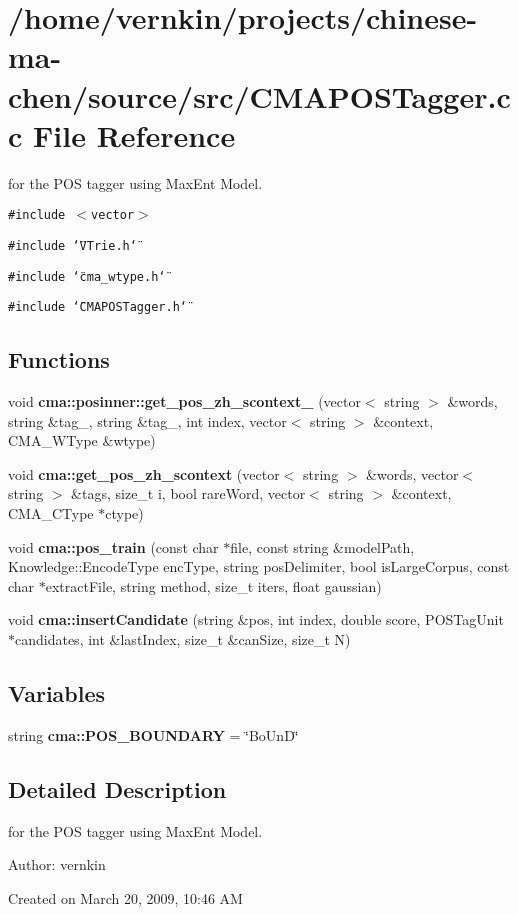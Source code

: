\section{/home/vernkin/projects/chinese-ma-chen/source/src/CMAPOSTagger.cc File Reference}
\label{CMAPOSTagger_8cc}
for the POS tagger using MaxEnt Model.  


{\tt \#include $<$vector$>$}\par
{\tt \#include \char`\"{}VTrie.h\char`\"{}}\par
{\tt \#include \char`\"{}cma\_\-wtype.h\char`\"{}}\par
{\tt \#include \char`\"{}CMAPOSTagger.h\char`\"{}}\par
\subsection*{Functions}
\begin{CompactItemize}
\item 
void \textbf{cma::posinner::get\_\-pos\_\-zh\_\-scontext\_} (vector$<$ string $>$ \&words, string \&tag\_, string \&tag\_, int index, vector$<$ string $>$ \&context, CMA\_\-WType \&wtype)\label{namespacecma_1_1posinner_f49e6c147898b0b7d3e88af33c64e8f1}

\item 
void {\bf cma::get\_\-pos\_\-zh\_\-scontext} (vector$<$ string $>$ \&words, vector$<$ string $>$ \&tags, size\_\-t i, bool rareWord, vector$<$ string $>$ \&context, CMA\_\-CType $\ast$ctype)
\item 
void {\bf cma::pos\_\-train} (const char $\ast$file, const string \&modelPath, Knowledge::EncodeType encType, string posDelimiter, bool isLargeCorpus, const char $\ast$extractFile, string method, size\_\-t iters, float gaussian)
\item 
void \textbf{cma::insertCandidate} (string \&pos, int index, double score, POSTagUnit $\ast$candidates, int \&lastIndex, size\_\-t \&canSize, size\_\-t N)\label{namespacecma_dbf7620e7e9b8dd78dbcb87e648fa8ae}

\end{CompactItemize}
\subsection*{Variables}
\begin{CompactItemize}
\item 
string \textbf{cma::POS\_\-BOUNDARY} = \char`\"{}BoUnD\char`\"{}\label{namespacecma_6d33cf1fe0a06dac555f3a85fec6c4a6}

\end{CompactItemize}


\subsection{Detailed Description}
for the POS tagger using MaxEnt Model. 

\begin{Desc}
\item[Author:]vernkin\end{Desc}
Created on March 20, 2009, 10:46 AM 